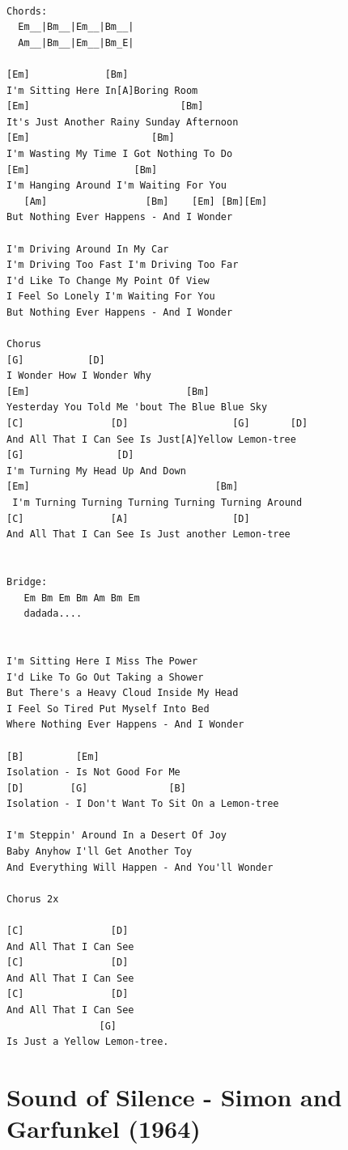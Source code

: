 \documentclass[
]{book}
\let\stdsection\section
\renewcommand\section{\clearpage\stdsection}
\begin{document}
\begin{verbatim}

Chords:
  Em__|Bm__|Em__|Bm__|
  Am__|Bm__|Em__|Bm_E|

[Em]             [Bm]
I'm Sitting Here In[A]Boring Room
[Em]                          [Bm]
It's Just Another Rainy Sunday Afternoon
[Em]                     [Bm]
I'm Wasting My Time I Got Nothing To Do
[Em]                  [Bm]
I'm Hanging Around I'm Waiting For You
   [Am]                 [Bm]    [Em] [Bm][Em]
But Nothing Ever Happens - And I Wonder

I'm Driving Around In My Car
I'm Driving Too Fast I'm Driving Too Far
I'd Like To Change My Point Of View
I Feel So Lonely I'm Waiting For You
But Nothing Ever Happens - And I Wonder

Chorus
[G]           [D]
I Wonder How I Wonder Why
[Em]                           [Bm]
Yesterday You Told Me 'bout The Blue Blue Sky
[C]               [D]                  [G]       [D]
And All That I Can See Is Just[A]Yellow Lemon-tree
[G]                [D]
I'm Turning My Head Up And Down
[Em]                                [Bm]
 I'm Turning Turning Turning Turning Turning Around
[C]               [A]                  [D]
And All That I Can See Is Just another Lemon-tree


Bridge:
   Em Bm Em Bm Am Bm Em 
   dadada....


I'm Sitting Here I Miss The Power
I'd Like To Go Out Taking a Shower
But There's a Heavy Cloud Inside My Head
I Feel So Tired Put Myself Into Bed
Where Nothing Ever Happens - And I Wonder

[B]         [Em]
Isolation - Is Not Good For Me
[D]        [G]              [B]
Isolation - I Don't Want To Sit On a Lemon-tree

I'm Steppin' Around In a Desert Of Joy
Baby Anyhow I'll Get Another Toy
And Everything Will Happen - And You'll Wonder

Chorus 2x

[C]               [D]
And All That I Can See
[C]               [D]
And All That I Can See
[C]               [D]
And All That I Can See
                [G]
Is Just a Yellow Lemon-tree.

\end{verbatim}

\hypertarget{sound-of-silence---simon-and-garfunkel-1964}{%
\section{Sound of Silence - Simon and Garfunkel (1964)}\label{sound-of-silence---simon-and-garfunkel-1964}}
\end{document}
